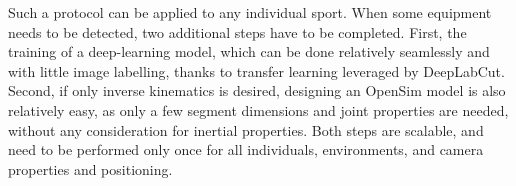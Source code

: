 Such a protocol can be applied to any individual sport. When some equipment needs to be detected, two additional steps have to be completed. First, the training of a deep-learning model, which can be done relatively seamlessly and with little image labelling, thanks to transfer learning leveraged by DeepLabCut. Second, if only inverse kinematics is desired, designing an OpenSim model is also relatively easy, as only a few segment dimensions and joint properties are needed, without any consideration for inertial properties. Both steps are scalable, and need to be performed only once for all individuals, environments, and camera properties and positioning. 











